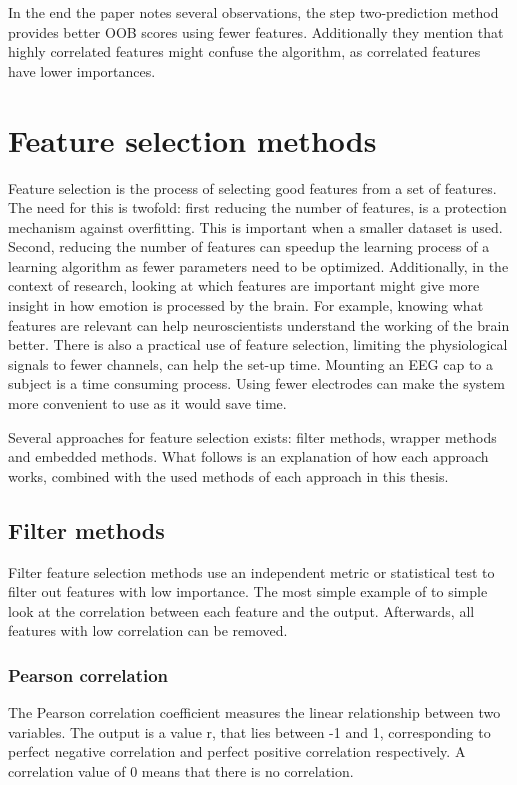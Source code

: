 \npar

In the end the paper notes several observations, the step two-prediction method provides better OOB scores using fewer features. Additionally they mention that highly correlated features might confuse the algorithm, as correlated features have lower importances.

\section{Feature selection methods}
\label{FSSel}
Feature selection is the process of selecting good features from a set of features. The need for this is twofold: first reducing the number of features, is a protection mechanism against overfitting\citep{rfPaper}. This is important when a smaller dataset is used. Second, reducing the number of features can speedup the learning process of a learning algorithm as fewer parameters need to be optimized. Additionally, in the context of research, looking at which features are important might give more insight in how emotion is processed by the brain. For example, knowing what features are relevant can help neuroscientists understand the working of the brain better. There is also a practical use of feature selection, limiting the physiological signals to fewer channels, can help the set-up time. Mounting an EEG cap to a subject is a time consuming process. Using fewer electrodes can make the system more convenient to use as it would save time.

\npar

Several approaches for feature selection exists: filter methods, wrapper methods and embedded methods. What follows is an explanation of how each approach works, combined with the used methods of each approach in this thesis.

\subsection{Filter methods}
Filter feature selection methods use an independent metric or statistical test to filter out features with low importance. The most simple example of to simple look at the correlation between each feature and the output. Afterwards, all features with low correlation can be removed.

\subsubsection{Pearson correlation}
The Pearson correlation coefficient measures the linear relationship between two variables. The output is a value r, that lies between -1 and 1, corresponding to perfect negative correlation and perfect positive correlation respectively. A correlation value of 0 means that there is no correlation.

